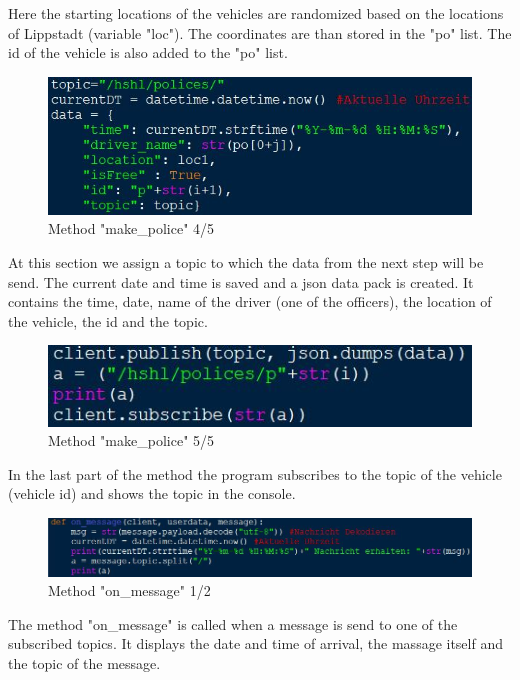 Here the starting locations of the vehicles are randomized based on the locations of Lippstadt (variable "loc"). The coordinates are than stored in the "po" list. The id of the vehicle is also added to the "po" list.
\begin{figure}[!h]
\center
\includegraphics[scale=0.6]{images/Heiber/a4.JPG}
\caption[caption]{Method "make\_police" 4/5}
\end{figure}
\newline
At this section we assign a topic to which the data from the next step will be send. The current date and time is saved and a json data pack is created. It contains the time, date, name of the driver (one of the officers), the location of the vehicle, the id and the topic.
\begin{figure}[!h]
\center
\includegraphics[scale=0.6]{images/Heiber/a5.JPG}
\caption[caption]{Method "make\_police" 5/5}
\end{figure}
\newpage
In the last part of the method the program subscribes to the topic of the vehicle (vehicle id) and shows the topic in the console.
\begin{figure}[!h]
\center
\includegraphics[scale=0.6]{images/Heiber/a6.JPG}
\caption[caption]{Method "on\_message" 1/2}
\end{figure}
\newline
The method "on\_message" is called when a message is send to one of the subscribed topics. It displays  the date and time of arrival, the massage itself and the topic of the message.
